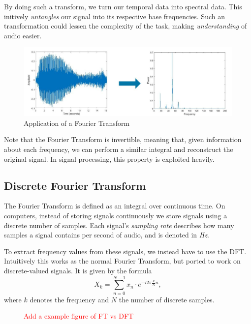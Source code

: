 By doing such a transform, we turn our temporal data into spectral data. This initively \textit{untangles} our signal into its respective base frequencies. Such an transformation could lessen the complexity of the task, making \textit{understanding} of audio easier.

\begin{figure}[H]
    \centering
    \includegraphics[scale=0.4]{figures/fft.jpg}
    \caption{Application of a Fourier Transform}
    \label{FTFigure}
\end{figure}

Note that the Fourier Transform is invertible, meaning that, given information about each frequency, we can perform a similar integral and reconstruct the original signal. In signal processing, this property is exploited heavily.

\subsection{Discrete Fourier Transform}

The Fourier Transform is defined as an integral over continuous time. On computers, instead of storing signals continuously we store signals using a discrete number of samples. Each signal's \textit{sampling rate} describes how many samples a signal contains per second of audio, and is denoted in \textit{Hz}.

To extract frequency values from these signals, we instead have to use the \gls{DFT}. Intuitively this works as the normal Fourier Transform, but ported to work on discrete-valued signals. It is given by the formula $$ X_k = \sum^{N - 1}_{n=0}{x_n \cdot e^{-i 2\pi \frac{k}{N} n}}, $$ where $k$ denotes the frequency and $N$ the number of discrete samples.

\begin{figure}[H]
    \centering
    \textcolor{red}{Add a example figure of FT vs DFT}
\end{figure}

